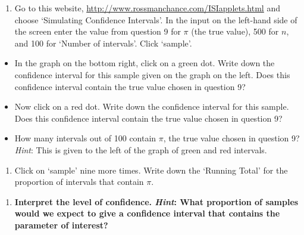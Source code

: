 \documentclass[
]{report}
\providecommand{\tightlist}{%
  \setlength{\itemsep}{0pt}\setlength{\parskip}{0pt}}
\begin{document}
\vspace{0.2in}

\begin{enumerate}
\def\labelenumi{\arabic{enumi}.}
\setcounter{enumi}{9}
\tightlist
\item
  Go to this website, \url{http://www.rossmanchance.com/ISIapplets.html} and choose `Simulating Confidence Intervals'. In the input on the left-hand side of the screen enter the value from question 9 for \(\pi\) (the true value), 500 for \(n\), and 100 for `Number of intervals'. Click `sample'.
\end{enumerate}

\vspace{1mm}

\begin{itemize}
\tightlist
\item
  In the graph on the bottom right, click on a green dot. Write down the confidence interval for this sample given on the graph on the left. Does this confidence interval contain the true value chosen in question 9?
\end{itemize}

\vspace{0.4in}

\begin{itemize}
\item
  Now click on a red dot. Write down the confidence interval for this sample. Does this confidence interval contain the true value chosen in question 9?
  \vspace{0.5in}
\item
  How many intervals out of 100 contain \(\pi\), the true value chosen in question 9? \emph{Hint}: This is given to the left of the graph of green and red intervals.
  \vspace{0.4in}
\end{itemize}

\begin{enumerate}
\def\labelenumi{\arabic{enumi}.}
\setcounter{enumi}{10}
\tightlist
\item
  Click on `sample' nine more times. Write down the `Running Total' for the proportion of intervals that contain \(\pi\).
\end{enumerate}

\vspace{0.5in}

\begin{enumerate}
\def\labelenumi{\arabic{enumi}.}
\setcounter{enumi}{11}
\tightlist
\item
  \textbf{Interpret the level of confidence. \emph{Hint}: What proportion of samples would we expect to give a confidence interval that contains the parameter of interest?}
\end{enumerate}
\end{document}

